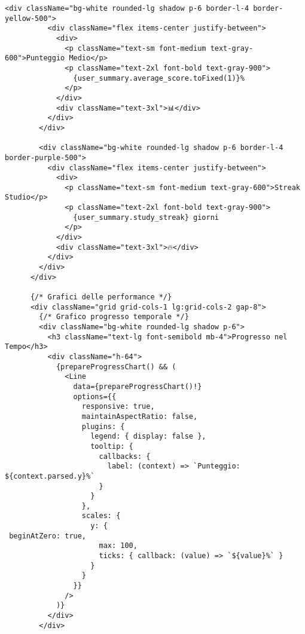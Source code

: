 \documentclass[a4paper, 14pt, oneside]{extbook}
\begin{document}
\begin{lstlisting}[style=javascriptstyle, caption=Dashboard Intelligente con Analytics Avanzate, label=lst:dashboard-component]
        <div className="bg-white rounded-lg shadow p-6 border-l-4 border-yellow-500">
          <div className="flex items-center justify-between">
            <div>
              <p className="text-sm font-medium text-gray-600">Punteggio Medio</p>
              <p className="text-2xl font-bold text-gray-900">
                {user_summary.average_score.toFixed(1)}%
              </p>
            </div>
            <div className="text-3xl">📊</div>
          </div>
        </div>

        <div className="bg-white rounded-lg shadow p-6 border-l-4 border-purple-500">
          <div className="flex items-center justify-between">
            <div>
              <p className="text-sm font-medium text-gray-600">Streak Studio</p>
              <p className="text-2xl font-bold text-gray-900">
                {user_summary.study_streak} giorni
              </p>
            </div>
            <div className="text-3xl">🔥</div>
          </div>
        </div>
      </div>

      {/* Grafici delle performance */}
      <div className="grid grid-cols-1 lg:grid-cols-2 gap-8">
        {/* Grafico progresso temporale */}
        <div className="bg-white rounded-lg shadow p-6">
          <h3 className="text-lg font-semibold mb-4">Progresso nel Tempo</h3>
          <div className="h-64">
            {prepareProgressChart() && (
              <Line 
                data={prepareProgressChart()!} 
                options={{
                  responsive: true,
                  maintainAspectRatio: false,
                  plugins: {
                    legend: { display: false },
                    tooltip: {
                      callbacks: {
                        label: (context) => `Punteggio: ${context.parsed.y}%`
                      }
                    }
                  },
                  scales: {
                    y: {
 beginAtZero: true,
                      max: 100,
                      ticks: { callback: (value) => `${value}%` }
                    }
                  }
                }}
              />
            )}
          </div>
        </div>


\end{lstlisting}
\end{document}

